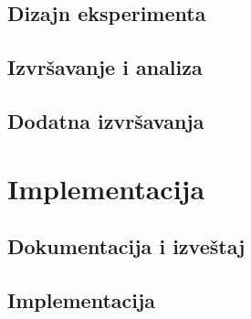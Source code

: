 \documentclass[a4paper,11pt]{book}
\begin{document}
\section{Dizajn eksperimenta}

\section{Izvršavanje i analiza}

\section{Dodatna izvršavanja}

\chapter{Implementacija}

\section{Dokumentacija i izveštaj}

\section{Implementacija}
\end{document}

